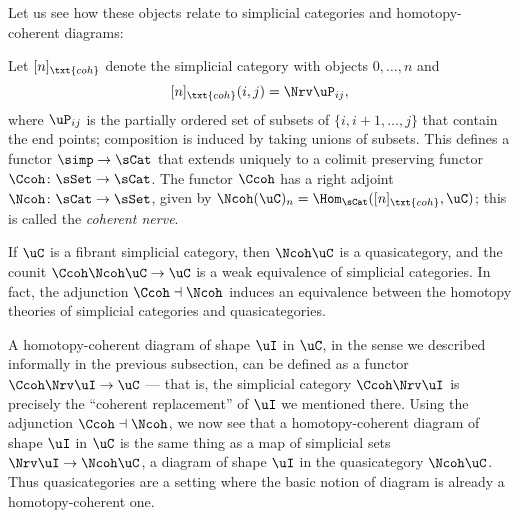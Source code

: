 \documentclass[a4paper,12pt]{article}
\begin{document}
Let us see how these objects relate to simplicial categories and
homotopy-coherent diagrams:
\begin{defn}
  Let $[n]_{\txt{coh}}$ denote the simplicial category with objects
  $0,\ldots,n$ and 
  \[ [n]_{\txt{coh}}(i,j) = \Nrv \uP_{ij},\] where $\uP_{ij}$ is the
  partially ordered set of subsets of $\{i,i+1,\dots,j\}$ that contain
  the end points; composition is induced by taking unions of
  subsets. This defines a functor $\simp \to \sCat$ that extends
  uniquely to a colimit preserving functor
  $\Ccoh \colon \sSet \to \sCat$. The functor $\Ccoh$ has a right
  adjoint $\Ncoh \colon \sCat \to \sSet$, given by
  $\Ncoh(\uC)_{n} = \Hom_{\sCat}([n]_{\txt{coh}}, \uC)$; this is
  called the \emph{coherent nerve}.
\end{defn}
If $\uC$ is a fibrant simplicial category, then $\Ncoh\uC$ is a
quasicategory, and the counit $\Ccoh\Ncoh\uC \to \uC$ is a weak
equivalence of simplicial categories. In fact, the adjunction
$\Ccoh \dashv \Ncoh$ induces an equivalence between the homotopy
theories of simplicial categories and quasicategories.

\begin{remark}\label{rmk:Ccoh}
  A homotopy-coherent diagram of shape $\uI$ in $\uC$, in the sense we
  described informally in the previous subsection, can be defined as a
  functor $\Ccoh \Nrv \uI \to \uC$ --- that is, the simplicial
  category $\Ccoh \Nrv \uI$ is precisely the ``coherent replacement''
  of $\uI$ we mentioned there. Using the adjunction
  $\Ccoh \dashv \Ncoh$, we now see that a homotopy-coherent diagram
  of shape $\uI$ in $\uC$ is the same thing as a map of simplicial
  sets $\Nrv \uI \to \Ncoh \uC$, \ie{} a diagram of shape $\uI$ in the
  quasicategory $\Ncoh \uC$.  Thus quasicategories are a setting where
  the basic notion of diagram is already a homotopy-coherent one.
\end{remark}
\end{document}
